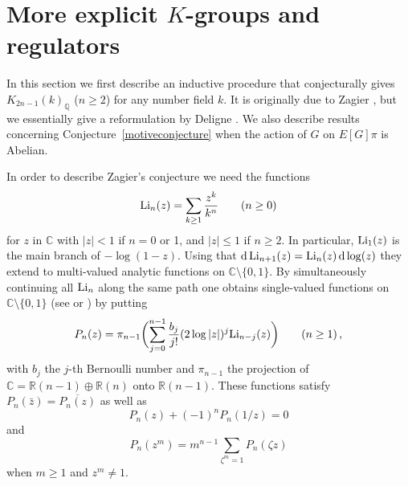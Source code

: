 \documentclass{amsart}
\begin{document}
\section{More explicit $ K $-groups and regulators}
\label{ksection}

In this section we first describe an inductive procedure that conjecturally gives $ {K_{2n-1}(k)_{\mathbb Q}}$
($ n \ge 2 $) for any number field $ k $.  It is originally due to Zagier \cite{Zag91}, but we essentially
give a reformulation by Deligne \cite{del:imd}.
We also describe results concerning Conjecture~\ref{motiveconjecture} when the action of $ G $ on $ E[G]\pi $
is Abelian.

In order to describe Zagier's conjecture we need the functions
\begin{equation}\label{Lindef}
{\textup{Li}}_n(z) = \sum_{k \geq 1} \frac{z^k}{k^n}
\qquad (n \geq 0)
\end{equation}
for $ z $ in $ {\mathbb C} $ with $ |z| < 1 $ if $ n = 0 $ or 1, and $ |z|\le1 $ if $ n \ge 2 $.
In particular, $ {\textup{Li}}_1(z) $ is the main branch of $ -\log(1-z) $.
Using that $ {{\textup{d}}} \, {\textup{Li}}_{n+1}(z) = {\textup{Li}}_n(z) \, {{\textup{d}}} \log(z) $ they extend to multi-valued analytic functions on
$ {\mathbb C}\setminus\{0,1\} $.
By simultaneously continuing all $ {\textup{Li}}_n $ along the same path one obtains single-valued functions on $ {\mathbb C}\setminus\{0,1\} $
(see \cite[\S~7]{Zag91} or \cite[Remark~5.2]{dJ95}) by putting
\begin{equation}\label{Pndef}
{P}_n(z)  = \pi_{n-1}\biggl( \sum_{j=0}^{n-1} \frac{b_j}{j!} (2\log|z|)^j {\textup{Li}}_{n-j}(z) \biggr)
\quad\quad (n \ge 1) \,,
\end{equation}
with $ b_j $ the $ j $-th Bernoulli number and $ \pi_{n-1} $ the projection of
$ {\mathbb C}={\mathbb R}(n-1)\oplus{\mathbb R}(n) $ onto $ {\mathbb R}(n-1) $.
These functions satisfy $  {P}_n(\bar z) = \overline{{P}_n(z)}  $ as well as
\begin{equation}\label{poleq}
{P}_n(z) + (-1)^n {P}_n (1/z) = 0
\end{equation}
and
\begin{equation}\label{distrieq}
{P}_n(z^m) = m^{n-1} \sum_{{\zeta}^m=1} {P}_n({\zeta} z)
\end{equation}
when $ m \ge 1 $ and $ z^m \ne 1 $.
\end{document}
